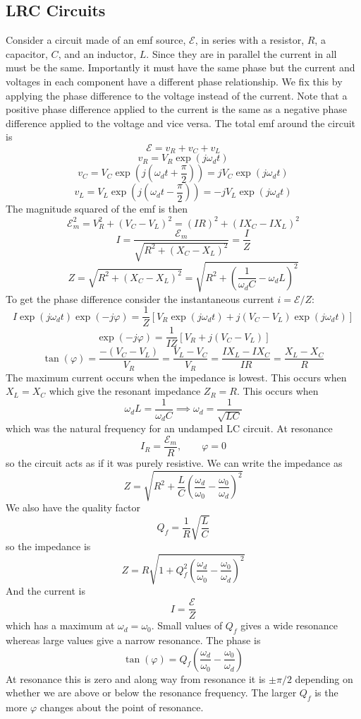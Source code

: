 \documentclass{article}
\newcommand{\emf}{\mathcal{E}}
\begin{document}
    \subsection{LRC Circuits}
    Consider a circuit made of an emf source, \(\emf\), in series with a resistor, \(R\), a capacitor, \(C\), and an inductor, \(L\).
    Since they are in parallel the current in all must be the same.
    Importantly it must have the same phase but the current and voltages in each component have a different phase relationship.
    We fix this by applying the phase difference to the voltage instead of the current.
    Note that a positive phase difference applied to the current is the same as a negative phase difference applied to the voltage and vice versa.
    The total emf around the circuit is
    \[\emf = v_R + v_C + v_L\]
    \[v_R = V_R\exp(j\omega_d t)\]
    \[v_C = V_C\exp\left(j\left(\omega_d t + \frac{\pi}{2}\right)\right) = jV_C\exp(j\omega_d t)\]
    \[v_L = V_L\exp\left(j\left(\omega_d t - \frac{\pi}{2}\right)\right) = -jV_L\exp(j\omega_d t)\]
    The magnitude squared of the emf is then
    \[\emf_m^2 = V_R^2 + (V_C - V_L)^2 = (IR)^2 + (IX_C - IX_L)^2\]
    \[I = \frac{\emf_m}{\sqrt{R^2 + (X_C - X_L)^2}} = \frac{I}{Z}\]
    \[Z = \sqrt{R^2 + (X_C - X_L)^2} = \sqrt{R^2 + \left(\frac{1}{\omega_d C} - \omega_d L\right)^2}\]
    To get the phase difference consider the instantaneous current \(i = \emf/Z\):
    \[I\exp(j\omega_d t)\exp(-j\varphi) = \frac{1}{Z}[V_R\exp(j\omega_d t) + j(V_C - V_L)\exp(j\omega_d t)]\]
    \[\exp(-j\varphi) = \frac{1}{IZ}[V_R + j(V_C - V_L)]\]
    \[\tan(\varphi) = \frac{-(V_C - V_L)}{V_R} = \frac{V_L - V_C}{V_R} = \frac{IX_L - IX_C}{IR} = \frac{X_L - X_C}{R}\]
    The maximum current occurs when the impedance is lowest.
    This occurs when \(X_L = X_C\) which give the resonant impedance \(Z_R = R\).
    This occurs when
    \[\omega_d L = \frac{1}{\omega_d C}\implies \omega_d = \frac{1}{\sqrt{LC}}\]
    which was the natural frequency for an undamped LC circuit.
    At resonance
    \[I_R = \frac{\emf_m}{R},\qquad \varphi = 0\]
    so the circuit acts as if it was purely resistive.
    We can write the impedance as
    \[Z = \sqrt{R^2 + \frac{L}{C}\left(\frac{\omega_d}{\omega_0} - \frac{\omega_0}{\omega_d}\right)^2}\]
    We also have the quality factor
    \[Q_f = \frac{1}{R}\sqrt{\frac{L}{C}}\]
    so the impedance is
    \[Z = R\sqrt{1 + Q_f^2\left(\frac{\omega_d}{\omega_0} - \frac{\omega_0}{\omega_d}\right)^2}\]
    And the current is
    \[I = \frac{\emf}{Z}\]
    which has a maximum at \(\omega_d = \omega_0\).
    Small values of \(Q_f\) gives a wide resonance whereas large values give a narrow resonance.
    The phase is
    \[\tan(\varphi) = Q_f\left(\frac{\omega_d}{\omega_0} - \frac{\omega_0}{\omega_d}\right)\]
    At resonance this is zero and along way from resonance it is \(\pm\pi/2\) depending on whether we are above or below the resonance frequency.
    The larger \(Q_f\) is the more \(\varphi\) changes about the point of resonance.
    
\end{document}
